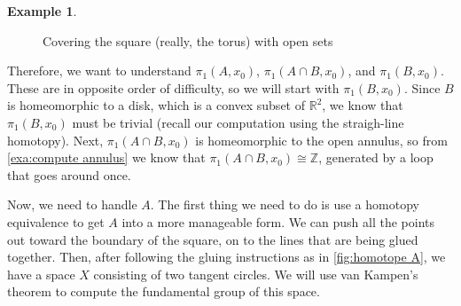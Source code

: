 \documentclass{article}
\theoremstyle{definition}
\newtheorem{exa}[thm]{Example}
\theoremstyle{remark}
\newcommand{\Z}{\mathbb Z}
\newcommand{\R}{\mathbb R}
\numberwithin{figure}{section}
\begin{document}
\begin{exa}
\begin{figure}[h]
		\caption{Covering the square (really, the torus) with open sets}
		\label{fig:covering torus}
	\end{figure}
	
	Therefore, we want to understand $\pi_1(A, x_0)$, $\pi_1(A \cap B, x_0)$, and $\pi_1(B, x_0)$. These are in opposite order of difficulty, so we will start with $\pi_1(B, x_0)$. Since $B$ is homeomorphic to a disk, which is a convex subset of $\R^2$, we know that $\pi_1(B, x_0)$ must be trivial (recall our computation using the straigh-line homotopy). Next, $\pi_1(A \cap B, x_0)$ is homeomorphic to the open annulus, so from \cref{exa:compute annulus} we know that $\pi_1(A \cap B, x_0) \cong \Z$, generated by a loop that goes around once.
	
	Now, we need to handle $A$. The first thing we need to do is use a homotopy equivalence to get $A$ into a more manageable form. We can push all the points out toward the boundary of the square, on to the lines that are being glued together. Then, after following the gluing instructions as in \cref{fig:homotope A}, we have a space $X$ consisting of two tangent circles. We will use van Kampen's theorem to compute the fundamental group of this space.
	
	\begin{figure}[h]
		\centering
\end{figure}
\end{exa}
\end{document}
